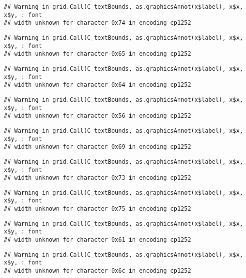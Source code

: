 \documentclass[
]{article}
\begin{document}
\begin{verbatim}
## Warning in grid.Call(C_textBounds, as.graphicsAnnot(x$label), x$x, x$y, : font
## width unknown for character 0x74 in encoding cp1252
\end{verbatim}

\begin{verbatim}
## Warning in grid.Call(C_textBounds, as.graphicsAnnot(x$label), x$x, x$y, : font
## width unknown for character 0x65 in encoding cp1252
\end{verbatim}

\begin{verbatim}
## Warning in grid.Call(C_textBounds, as.graphicsAnnot(x$label), x$x, x$y, : font
## width unknown for character 0x64 in encoding cp1252
\end{verbatim}

\begin{verbatim}
## Warning in grid.Call(C_textBounds, as.graphicsAnnot(x$label), x$x, x$y, : font
## width unknown for character 0x56 in encoding cp1252
\end{verbatim}

\begin{verbatim}
## Warning in grid.Call(C_textBounds, as.graphicsAnnot(x$label), x$x, x$y, : font
## width unknown for character 0x69 in encoding cp1252
\end{verbatim}

\begin{verbatim}
## Warning in grid.Call(C_textBounds, as.graphicsAnnot(x$label), x$x, x$y, : font
## width unknown for character 0x73 in encoding cp1252
\end{verbatim}

\begin{verbatim}
## Warning in grid.Call(C_textBounds, as.graphicsAnnot(x$label), x$x, x$y, : font
## width unknown for character 0x75 in encoding cp1252
\end{verbatim}

\begin{verbatim}
## Warning in grid.Call(C_textBounds, as.graphicsAnnot(x$label), x$x, x$y, : font
## width unknown for character 0x61 in encoding cp1252
\end{verbatim}

\begin{verbatim}
## Warning in grid.Call(C_textBounds, as.graphicsAnnot(x$label), x$x, x$y, : font
## width unknown for character 0x6c in encoding cp1252
\end{verbatim}
\end{document}
